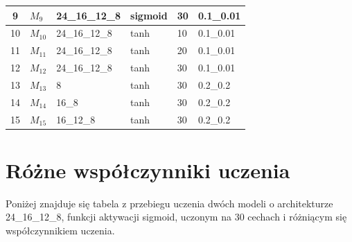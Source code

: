 \documentclass{report}
\begin{document}
\begin{minipage}{\textwidth}
\begin{longtable}{|c|l|l|l|l|l|}
                     9 & $M_{9}$ & 24\_16\_12\_8 & sigmoid & 30 & 0.1\_0.01 \\ \hline
                     10 & $M_{10}$ & 24\_16\_12\_8 & tanh & 10 & 0.1\_0.01 \\ \hline
                     11 & $M_{11}$ & 24\_16\_12\_8 & tanh & 20 & 0.1\_0.01 \\ \hline
                     12 & $M_{12}$ & 24\_16\_12\_8 & tanh & 30 & 0.1\_0.01 \\ \hline
                     13 & $M_{13}$ & 8 & tanh & 30 & 0.2\_0.2 \\ \hline
                     14 & $M_{14}$ & 16\_8 & tanh & 30 & 0.2\_0.2 \\ \hline
                     15 & $M_{15}$ & 16\_12\_8 & tanh & 30 & 0.2\_0.2 \\ \hline
                 \end{longtable}
    \end{minipage}

    \section{Różne współczynniki uczenia}\label{sec:rozneWspolczynnikiUczenia}

    Poniżej znajduje się tabela z przebiegu uczenia dwóch modeli o architekturze 24\_16\_12\_8, funkcji aktywacji sigmoid, uczonym na 30 cechach i różniącym się współczynnikiem uczenia.
\end{document}

